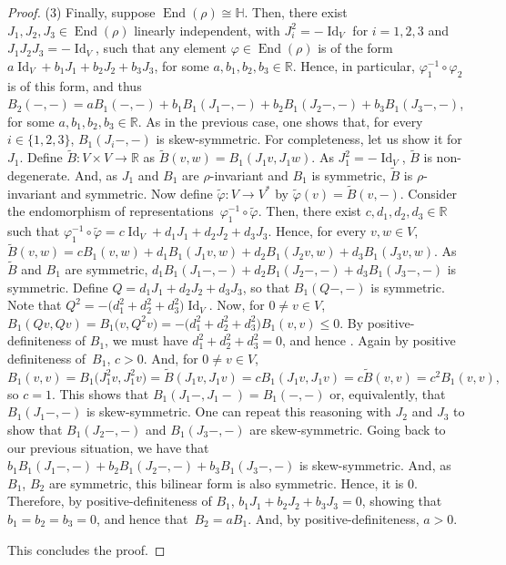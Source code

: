 \documentclass[pdftex]{sigma}
\numberwithin{equation}{section}
\DeclareMathOperator{\Id}{Id}
\DeclareMathOperator{\End}{End}
\begin{document}
\begin{proof}
(3) Finally, suppose $\End(\rho) \cong \mathbb{H}$. Then, there exist $J_1,J_2,J_3\in \End(\rho)$ linearly independent, with $J_i^2 = -\Id_V$ for $i=1,2,3$ and $J_1 J_2 J_3 =-\Id_V$, such that any element $\varphi \in \End(\rho)$ is of the form $a \Id_V + b_1 J_1 + b_2 J_2 + b_3 J_3$, for some $a,b_1,b_2,b_3 \in \mathbb{R}$. Hence, in particular, $\varphi_1^{-1} \circ \varphi_2$ is of this form, and thus $B_2(-,-) = a B_1(-,-) + b_1 B_1 (J_1-,-) + b_2 B_1 (J_2-,-) + b_3 B_1 (J_3-,-)$, for some $a,b_1,b_2,b_3 \in \mathbb{R}$. As in the previous case, one shows that, for every~${i \in \{1,2,3\}}$, $B_1(J_i-,-)$ is skew-symmetric. For completeness, let us show it for $J_1$. Define $\tilde{B} \colon V \times V \to \mathbb{R}$ as $\tilde{B}(v,w) = B_1 (J_1v,J_1w)$. As $J_1^2 = -\Id_V$, $\tilde{B}$ is non-degenerate. And, as $J_1$ and $B_1$ are $\rho$-invariant and $B_1$ is symmetric, $\tilde{B}$ is $\rho$-invariant and symmetric. Now define $\tilde{\varphi} \colon V \to V^{*}$ by $\tilde{\varphi} (v) = \tilde{B}(v,-)$. Consider the endomorphism of representations~${\varphi_{1}^{-1} \circ \tilde{\varphi}}$. Then, there exist $c,d_1,d_2,d_3 \in \mathbb{R}$ such that $\varphi_{1}^{-1} \circ \tilde{\varphi}=c \Id_V + d_1 J_1 + d_2J_2 +d_3J_3$. Hence, for every $v,w \in V$, $\tilde{B}(v,w) = c B_1(v,w) + d_1 B_1(J_1v,w) + d_2 B_1(J_2v,w) + d_3 B_1(J_3v,w)$. As $\tilde{B}$ and $B_1$ are symmetric, $d_1 B_1(J_1-,-) + d_2 B_1(J_2-,-) + d_3 B_1(J_3-,-)$ is symmetric. Define $Q= d_1J_1 + d_2J_2 +d_3J_3$, so that $B_1(Q-,-)$ is symmetric. Note that $Q^2 = -\bigl(d_1^2+d_2^2+d_3^2\bigr)\Id_V$. Now, for $0 \neq v \in V$, $B_1(Qv,Qv) = B_1\bigl(v,Q^2v\bigr)=-\bigl(d_1^2+d_2^2+d_3^2\bigr) B_1(v,v) \leq 0$. By positive-definiteness of $B_1$, we must have $d_1^2+d_2^2+d_3^2=0$, and hence . Again by positive definiteness of~$B_1$, $c>0$. And, for $0 \neq v \in V$,
\[
B_1(v,v)=B_1\bigl(J_1^2 v, J_1^2v\bigr) = \tilde{B}(J_1 v, J_1 v) = c B_1(J_1v,J_1v) = c \tilde{B}(v,v) = c^2 B_1(v,v),
\]
 so $c=1$. This shows that $B_1(J_1-,J_1-)= B_1(-,-)$ or, equivalently, that $B_1(J_1-,-)$ is skew-symmetric. One can repeat this reasoning with $J_2$ and $J_3$ to show that $B_1(J_2-,-)$ and $B_1(J_3-,-)$ are skew-symmetric. Going back to our previous situation, we have that $b_1 B_1(J_1-,-)\allowbreak + b_2 B_1(J_2-,-) + b_3 B_1(J_3-,-)$ is skew-symmetric. And, as $B_1$, $B_2$ are symmetric, this bilinear form is also symmetric. Hence, it is $0$. Therefore, by positive-definiteness of $B_1$, $b_1 J_1 + b_2J_2 +b_3J_3=0$, showing that $b_1=b_2=b_3=0$, and hence that~${B_2=a B_1}$. And, by positive-definiteness, $a>0$.

This concludes the proof.
		\end{proof}
		
\end{document}
